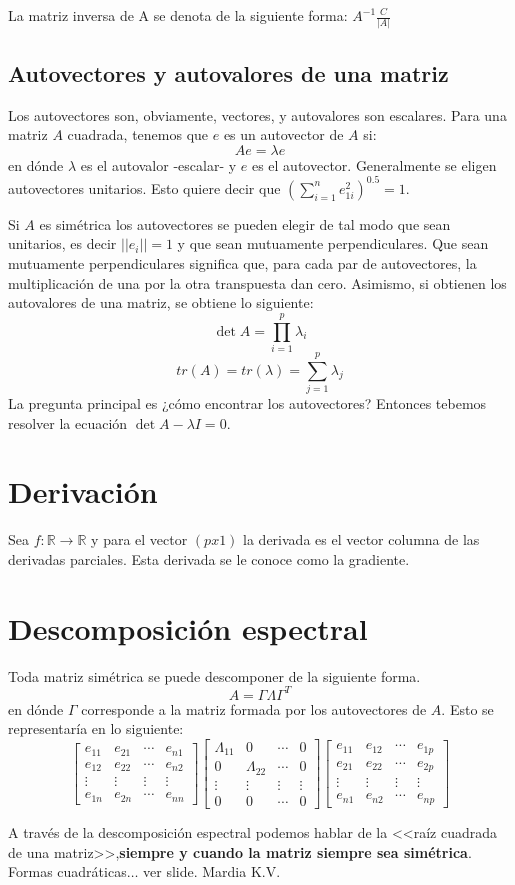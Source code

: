 \documentclass{article}
\begin{document}
La matriz inversa de A se denota de la siguiente forma: $A^{-1}\frac{C}{|A|}$

\subsection{Autovectores y autovalores de una matriz}
Los autovectores son, obviamente, vectores, y autovalores son escalares. Para una matriz $A$ cuadrada, tenemos que $e$ es un autovector de $A$ si:
\[
Ae=\lambda e
\]
en dónde $\lambda$ es el autovalor -escalar- y $e$ es el autovector. Generalmente se eligen autovectores unitarios. Esto quiere decir que ${(\sum_{i=1}^{n} e^{2}_{1i})}^{0.5}=1$. 

Si $A$ es simétrica los autovectores se pueden elegir de tal modo que sean unitarios, es decir $||e_{i}||=1$ y que sean mutuamente perpendiculares. Que sean mutuamente perpendiculares significa que, para cada par de autovectores, la multiplicación de una por la otra transpuesta dan cero.
Asimismo, si obtienen los autovalores de una matriz, se obtiene lo siguiente:
\[ 
\det{A}=\prod_{i=1}^{p}\lambda_{i}
\]
\[
	tr(A)=tr(\lambda)=\sum_{j=1}^{p}\lambda_{j}
\]
La pregunta principal es ¿cómo encontrar los autovectores? Entonces tebemos resolver la ecuación $\det{A-\lambda I}=0$.

\section{Derivación}
Sea $f:\mathbb{R} \rightarrow \mathbb{R}$ y para el vector $(px1)$ la derivada es el vector columna de las derivadas parciales. Esta derivada se le conoce como la gradiente.

\section{Descomposición espectral}
Toda matriz simétrica se puede descomponer de la siguiente forma.
\[ 
A = \Gamma \Lambda \Gamma^{T}
\]
en dónde $\Gamma$ corresponde a la matriz formada por los autovectores de $A$. Esto se representaría en lo siguiente:
\[
\begin{bmatrix}
e_{11} & e_{21} & \cdots & e_{n1} \\
e_{12} & e_{22} & \cdots & e_{n2} \\
\vdots & \vdots & \vdots & \vdots \\
e_{1n} & e_{2n} & \cdots&e_{nn} 
\end{bmatrix}
\begin{bmatrix}
\Lambda_{11} & 0 & \cdots & 0 \\
0 & \Lambda_{22} & \cdots & 0 \\
\vdots & \vdots & \vdots & \vdots \\
0 & 0 & \cdots & 0
\end{bmatrix}
\begin{bmatrix}
e_{11} & e_{12} & \cdots & e_{1p} \\
e_{21} & e_{22} & \cdots & e_{2p} \\
\vdots & \vdots & \vdots & \vdots \\
e_{n1} & e_{n2} & \cdots & e_{np}
\end{bmatrix}
\]

A través de la descomposición espectral podemos hablar de la <<raíz cuadrada de una matriz>>,\textbf{siempre y cuando la matriz siempre sea simétrica}.
Formas cuadráticas$\ldots$ ver slide.
Mardia K.V. 
\end{document}
